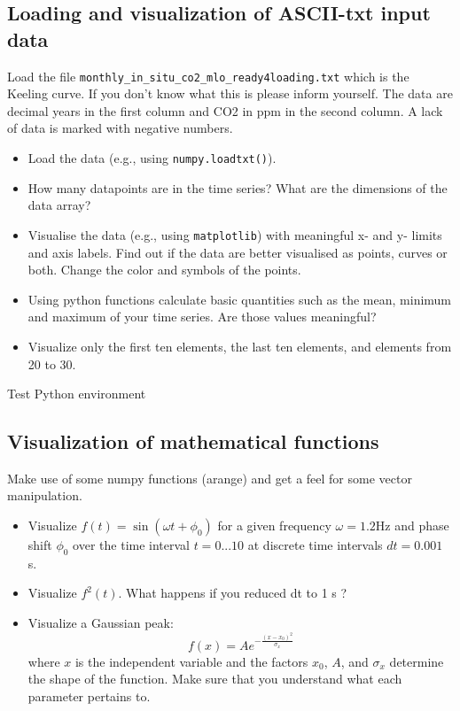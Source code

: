 \subsection{Loading and visualization of ASCII-txt input data}
\label{sec:viskeeling}
Load the file \verb|monthly_in_situ_co2_mlo_ready4loading.txt| which is the Keeling curve. If you don't know what this is please inform yourself. The data are decimal years in the first column and CO2 in ppm in the second column. A lack of data is marked with negative numbers.
\begin{itemize}
\item Load the data (e.g., using \verb|numpy.loadtxt()|).
\item How many datapoints are in the time series? What are the dimensions of the data array?
\item Visualise the data (e.g., using \verb|matplotlib|) with  meaningful x- and y- limits and axis labels. Find out if the data are better visualised as points, curves or both. Change the color and symbols of the points.
\item Using python functions calculate basic quantities such as the mean, minimum and maximum of your time series. Are those values meaningful?
\item Visualize only the first ten elements, the last ten elements, and elements from 20 to 30.
\end{itemize}
\ifanswers
\begin{tcolorbox}[enhanced jigsaw,breakable,pad at break*=1mm,
  colback=blue!5!white,colframe=babyblueeyes,title=Solutions,
  watermark color=white]
  Test Python environment
  
\end{tcolorbox}
\fi


\subsection{Visualization of mathematical functions}
\label{sec:mathfunc}
Make use of some numpy functions (arange) and get a feel for some vector manipulation.
\begin{itemize}
  \item Visualize $f(t)=\sin(\omega t + \phi_0)$ for a given frequency $\omega=1.2$Hz and phase shift $\phi_0$ over the time interval $t=0...10$ at discrete time intervals $dt=0.001$ s.
  \item Visualize $f^2(t)$. What happens if you reduced dt to 1 s ?
  \item Visualize a Gaussian peak:
  $$
  f(x) = Ae^{-\frac{(x-x_0)^2}{\sigma_x}}
  $$
  where $x$ is the independent variable and the factors $x_0$, $A$, and $\sigma_x$ determine the shape of the function. Make sure that you understand what each parameter pertains to.
\end{itemize}

